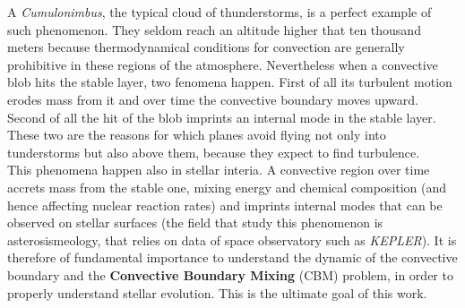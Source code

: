 A \textit{Cumulonimbus}, the typical cloud of thunderstorms, is a perfect example of such phenomenon. They seldom reach an altitude higher that ten thousand meters because thermodynamical conditions for convection are generally prohibitive in these regions of the atmosphere. Nevertheless when a convective blob hits the stable layer, two fenomena happen. First of all its turbulent motion erodes mass from it and over time the convective boundary moves upward. Second of all the hit of the blob imprints an internal mode in the stable layer. These two are the reasons for which planes avoid flying not only into tunderstorms but also above them, because they expect to find turbulence. \\
This phenomena happen also in stellar interia. A convective region over time accrets mass from the stable one, mixing energy and chemical composition (and hence affecting nuclear reaction rates) and imprints internal modes that can be observed on stellar surfaces (the field that study this phenomenon is asterosismeology, that relies on data of space observatory such as \textit{KEPLER}). It is therefore of fundamental importance to understand the dynamic of the convective boundary and the \textbf{Convective Boundary Mixing} (CBM) problem, in order to properly understand stellar evolution. This is the ultimate goal of this work.


